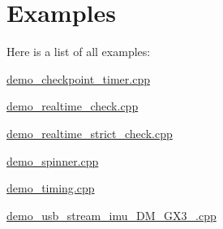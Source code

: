 \section{Examples}
Here is a list of all examples\+:\begin{DoxyCompactItemize}
\item 
\hyperlink{demo_checkpoint_timer_8cpp-example}{demo\+\_\+checkpoint\+\_\+timer.\+cpp}
\item 
\hyperlink{demo_realtime_check_8cpp-example}{demo\+\_\+realtime\+\_\+check.\+cpp}
\item 
\hyperlink{demo_realtime_strict_check_8cpp-example}{demo\+\_\+realtime\+\_\+strict\+\_\+check.\+cpp}
\item 
\hyperlink{demo_spinner_8cpp-example}{demo\+\_\+spinner.\+cpp}
\item 
\hyperlink{demo_timing_8cpp-example}{demo\+\_\+timing.\+cpp}
\item 
\hyperlink{demo_usb_stream_imu_3DM_GX3_25_8cpp-example}{demo\+\_\+usb\+\_\+stream\+\_\+imu\+\_\+D\+M\+\_\+\+G\+X3\+\_.\+cpp}
\end{DoxyCompactItemize}
